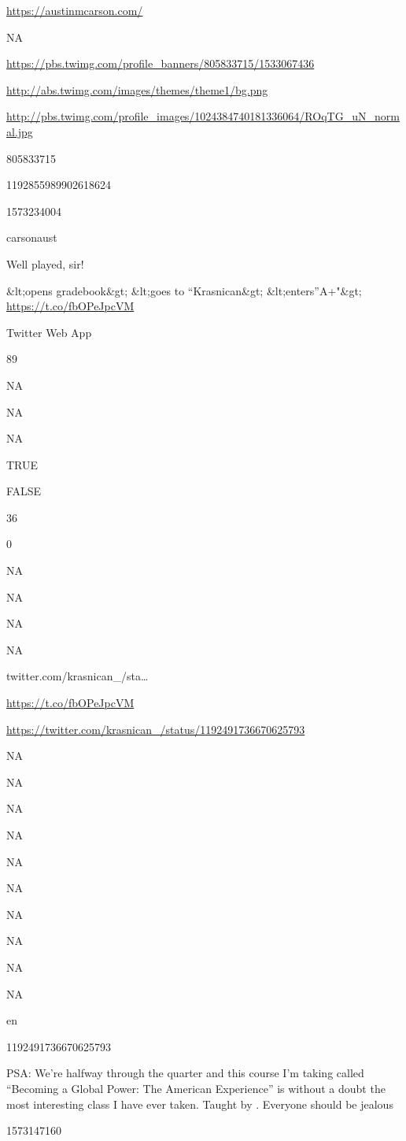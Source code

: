 \documentclass[]{book}
\begin{document}
\url{https://austinmcarson.com/}

NA

\url{https://pbs.twimg.com/profile_banners/805833715/1533067436}

\url{http://abs.twimg.com/images/themes/theme1/bg.png}

\url{http://pbs.twimg.com/profile_images/1024384740181336064/ROqTG_uN_normal.jpg}

805833715

1192855989902618624

1573234004

carsonaust

Well played, sir!

\&lt;opens gradebook\&gt;
\&lt;goes to ``Krasnican\&gt;
\&lt;enters''A+"\&gt; \url{https://t.co/fbOPeJpcVM}

Twitter Web App

89

NA

NA

NA

TRUE

FALSE

36

0

NA

NA

NA

NA

twitter.com/krasnican\_/sta\ldots{}

\url{https://t.co/fbOPeJpcVM}

\url{https://twitter.com/krasnican_/status/1192491736670625793}

NA

NA

NA

NA

NA

NA

NA

NA

NA

NA

en

1192491736670625793

PSA: We're halfway through the quarter \citet{UChicago} and this course I'm taking called ``Becoming a Global Power: The American Experience'' is without a doubt the most interesting class I have ever taken. Taught by \citet{carsonaust}. Everyone should be jealous

1573147160
\end{document}
